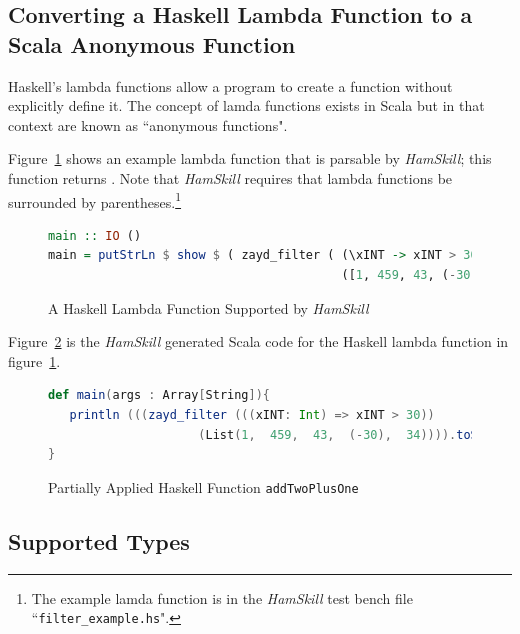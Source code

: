 \documentclass{report}
\begin{document}
\subsection{Converting a Haskell Lambda Function to a Scala Anonymous Function}\label{sec:lambdaAnonymousFunctions}

Haskell's lambda functions allow a program to create a function without explicitly define it.  The concept of lamda functions exists in Scala but in that context are known as ``anonymous functions".

Figure~\ref{fig:haskellLambdaFunction} shows an example lambda function that is parsable by \textit{HamSkill}; this function returns .  Note that  \textit{HamSkill} requires that lambda functions be surrounded by parentheses.\footnote{The example lamda function is in the \textit{HamSkill} test bench file ``\texttt{filter\_example.hs}".}

\begin{figure}[H]
\begin{mdframed}
\begin{lstlisting}[language=Haskell, basicstyle=\scriptsize]
main :: IO ()
main = putStrLn $ show $ ( zayd_filter ( (\xINT -> xINT > 30) ) 
                                         ([1, 459, 43, (-30), 34]) )
\end{lstlisting}
\end{mdframed}
\caption{A Haskell Lambda Function Supported by \textit{HamSkill}}\label{fig:haskellLambdaFunction}
\end{figure}

Figure~\ref{fig:scalaLambdaFunction} is the \textit{HamSkill} generated Scala code for the Haskell lambda function in figure~\ref{fig:haskellLambdaFunction}.

\begin{figure}[H]
\begin{mdframed}
\begin{lstlisting}[language=Scala, basicstyle=\scriptsize]
def main(args : Array[String]){
   println (((zayd_filter (((xINT: Int) => xINT > 30)) 
                     (List(1,  459,  43,  (-30),  34)))).toString())
} 
\end{lstlisting}
\end{mdframed}
\caption{Partially Applied Haskell Function \texttt{addTwoPlusOne}}\label{fig:scalaLambdaFunction}
\end{figure}

\subsection{Supported Types}\label{sec:supportedTypes}
\end{document}

